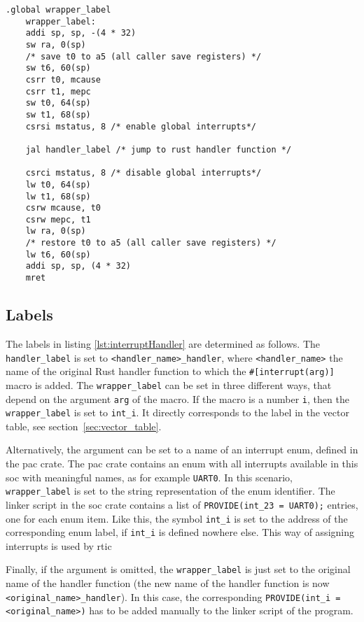 \begin{lstlisting}[language={[RISC-V]Assembler}, caption={Interrupt Handler Wrapper}, label={lst:interruptHandler}]
    .global wrapper_label
    wrapper_label:
    addi sp, sp, -(4 * 32)
    sw ra, 0(sp)
    /* save t0 to a5 (all caller save registers) */
    sw t6, 60(sp)
    csrr t0, mcause
    csrr t1, mepc
    sw t0, 64(sp)
    sw t1, 68(sp)
    csrsi mstatus, 8 /* enable global interrupts*/
    
    jal handler_label /* jump to rust handler function */
    
    csrci mstatus, 8 /* disable global interrupts*/
    lw t0, 64(sp)
    lw t1, 68(sp)
    csrw mcause, t0
    csrw mepc, t1
    lw ra, 0(sp)
    /* restore t0 to a5 (all caller save registers) */
    lw t6, 60(sp)
    addi sp, sp, (4 * 32)
    mret
\end{lstlisting}

\subsection{Labels}
\label{sec:interrupt_macro_labels}
The labels in listing \ref{lst:interruptHandler} are determined as follows. The \texttt{handler_label} is set to \texttt{<handler_name>_handler}, where \texttt{<handler_name>} the name of the original Rust handler function to which the \texttt{\#[interrupt(arg)]} macro is added. The \texttt{wrapper_label} can be set in three different ways, that depend on the argument \texttt{arg} of the macro. If the macro is a number \texttt{i}, then the \texttt{wrapper_label} is set to \texttt{int_i}. It directly corresponds to the label in the vector table, see section~\ref{sec:vector_table}.

Alternatively, the argument can be set to a name of an interrupt enum, defined in the \gls{pac} crate. 
The \gls{pac} crate contains an enum with all interrupts available in this \gls{soc} with meaningful names, as for example \texttt{UART0}. In this scenario, \texttt{wrapper_label} is set to the string representation of the enum identifier.
The linker script in the \gls{soc} crate contains a list of \texttt{PROVIDE(int_23 = UART0);} entries, one for each enum item. Like this, the symbol \texttt{int_i} is set to the address of the corresponding enum label, if \texttt{int_i} is defined nowhere else. This way of assigning interrupts is used by \gls{rtic}

Finally, if the argument is omitted, the \texttt{wrapper_label} is just set to the original name of the handler function (the new name of the handler function is now \texttt{<original_name>_handler}). In this case, the corresponding \texttt{PROVIDE(int_i = <original_name>)} has to be added manually to the linker script of the program.

